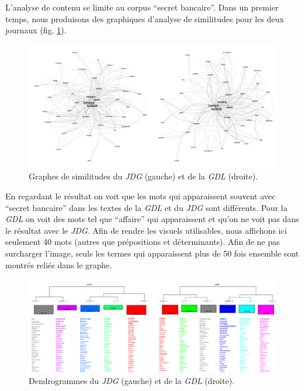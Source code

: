 \documentclass[a4paper, 11pt]{article}
\begin{document}
L'analyse de contenu se limite au corpus ``secret bancaire''. Dans un
premier temps, nous produisons des graphiques d'analyse de similitudes
pour les deux journaux (fig. \ref{similitudes}).

\begin{figure}
\centering
\includegraphics[width=1\textwidth ]{methodology/similitude.png}
\caption{Graphes de similitudes du \emph{JDG} (gauche) et de la
\emph{GDL} (droite).}
\label{similitudes}
\end{figure}

En regardant le résultat on voit que les mots qui apparaissent souvent
avec ``secret bancaire'' dans les textes de la \emph{GDL} et du
\emph{JDG} sont différents. Pour la \emph{GDL} on voit des mots tel que
``affaire'' qui apparaissent et qu'on ne voit pas dans le résultat avec
le \emph{JDG}.
Afin de rendre les visuels utilisables, nous affichons ici seulement 40
mots (autres que prépositions et déterminants). Afin de ne pas surcharger
l'image, seuls les termes qui apparaissent plus de 50 fois ensemble sont
montrés reliés dans le graphe.



\begin{figure}
\centering
\includegraphics[width=1\textwidth ]{methodology/dendrogram.png}
\caption{Dendrogrammes du \emph{JDG} (gauche) et de la \emph{GDL}
(droite).}
\label{dendrogrammes}
\end{figure}
\end{document}
